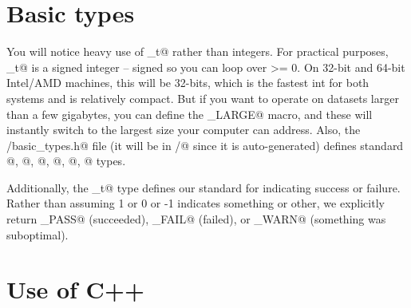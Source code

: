 \documentclass[letter]{report}
\begin{document}
\section{Basic types}

You will notice heavy use of \verb@index_t@ rather than integers. For
practical purposes, \verb@index_t@ is a signed integer -- signed so
you can loop over >= 0. On 32-bit and 64-bit Intel/AMD machines, this
will be 32-bits, which is the fastest int for both systems and is
relatively compact. But if you want to operate on datasets larger than
a few gigabytes, you can define the \verb@SCALE_LARGE@ macro, and
these will instantly switch to the largest size your computer can
address.  Also, the \verb@base/basic_types.h@ file (it will be in
\verb@bin/@ since it is auto-generated) defines standard @,
@, @, @, @,
@ types.

Additionally, the \verb@success_t@ type defines our standard for
indicating success or failure. Rather than assuming 1 or 0 or -1
indicates something or other, we explicitly return \verb@SUCCESS_PASS@
(succeeded), \verb@SUCCESS_FAIL@ (failed), or \verb@SUCCESS_WARN@
(something was suboptimal).

\section{Use of C++}
\end{document}
